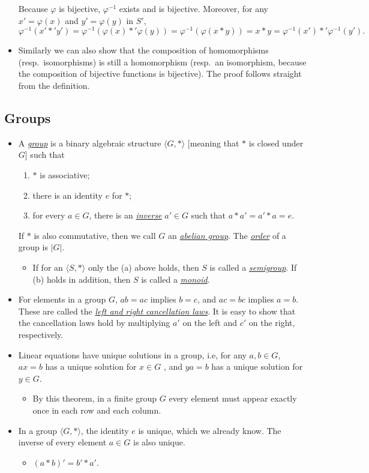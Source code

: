 \documentclass[11pt]{article}
\newcommand{\df}[1]{\ul{\textit{\textsf{#1}}}}
\newcommand{\la}{\langle}
\newcommand{\ra}{\rangle}
\renewcommand{\phi}{\varphi}
\begin{document}
\begin{itemize}
    Because $\phi$ is bijective, $\phi^{-1}$ exists and is bijective. Moreover, for any $x' = \phi(x)$ and $y' = \phi(y)$ in $S'$, \[\phi^{-1}(x' \ast' y') = \phi^{-1}(\phi(x) \ast' \phi(y)) = \phi^{-1}(\phi(x \ast y)) = x \ast y = \phi^{-1}(x') \ast' \phi^{-1}(y').\]
    \item Similarly we can also show that the composition of homomorphisms (resp.\ isomorphisms) is still a homomorphism (resp.\ an isomorphism, because the composition of bijective functions is bijective). The proof follows straight from the definition.
\end{itemize}

\subsection{Groups}
\begin{itemize}
    \item A \df{group} is a binary algebraic structure $\la G, \ast \ra$ [meaning that $\ast$ is closed under $G$] such that
    \begin{enumerate}[label=(\alph*)]
        \item $\ast$ is associative;
        \item there is an identity $e$ for $\ast$;
        \item for every $a \in G$, there is an \df{inverse} $a' \in G$ such that $a \ast a' = a' \ast a = e$.
    \end{enumerate}
    If $\ast$ is also commutative, then we call $G$ an \df{abelian group}. The \df{order} of a group is $|G|$.
    \begin{itemize}
        \item If for an $\la S,\ast \ra$ only the (a) above holds, then $S$ is called a \df{semigroup}. If (b) holds in addition, then $S$ is called a \df{monoid}.
    \end{itemize}
     \item For elements in a group $G$, $ab = ac$ implies $b = c$, and $ac = bc$ implies $a = b$. These are called the \df{left and right cancellation laws}. It is easy to show that the cancellation laws hold by multiplying $a'$ on the left and $c'$ on the right, respectively.
    \item Linear equations have unique solutions in a group, i.e, for any $a,b \in G$, $ax=b$ has a unique solution for $x \in G$ , and $ya = b$ has a unique solution for $y \in G$.
    \begin{itemize}
        \item By this theorem, in a finite group $G$ every element must appear exactly once in each row and each column.
    \end{itemize}
    \item In a group $\la G,\ast \ra$, the identity $e$ is unique, which we already know. The inverse of every element $a \in G$ is also unique.
    \begin{itemize}
        \item $(a \ast b)' = b' \ast a'$.
    \end{itemize}
\end{itemize}
\end{document}
